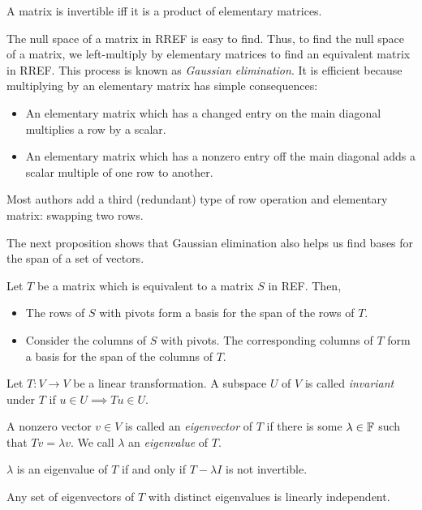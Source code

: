 \begin{prop}
  A matrix is invertible iff it is a product of elementary matrices.
\end{prop}
\begin{rem}
  The null space of a matrix in RREF is easy to find.
  Thus, to find the null space of a matrix, we left-multiply by elementary
  matrices to find an equivalent matrix in RREF\@. This process is known as
  \emph{Gaussian elimination}. It is efficient because
  multiplying by an elementary matrix has simple consequences:
  \begin{itemize}
    \item An elementary matrix which has a changed entry on the main diagonal
      multiplies a row by a scalar.
    \item An elementary matrix which has a nonzero entry off the main diagonal
      adds a scalar multiple of one row to another. 
  \end{itemize}
  Most authors add a third (redundant) type of row operation and elementary
  matrix: swapping two rows.

  The next proposition shows that Gaussian elimination also helps us find bases
  for the span of a set of vectors.
\end{rem}
\begin{prop}
  Let $T$ be a matrix which is equivalent to a matrix $S$ in REF\@. Then,
  \begin{itemize}
    \item The rows of $S$ with pivots form a basis for the span of the rows of $T$.
    \item Consider the columns of $S$ with pivots. The corresponding columns of
      $T$ form a basis for the span of the columns of $T$.
  \end{itemize}
\end{prop}
\begin{defn}
  Let $T:V\to V$ be a linear transformation. A subspace $U$ of $V$ is called
  \emph{invariant} under $T$ if $u\in U\implies Tu\in U$.

  A nonzero vector $v\in V$ is called an \emph{eigenvector} of $T$ if there is
  some $\lambda\in\mathbb{F}$ such that $Tv=\lambda v$. We call $\lambda$ an
  \emph{eigenvalue} of $T$.
\end{defn}
\begin{prop}
  $\lambda$ is an eigenvalue of $T$ if and only if $T-\lambda I$ is not
  invertible.
\end{prop}
\begin{prop}
  Any set of eigenvectors of $T$ with distinct eigenvalues is linearly
  independent.
\end{prop}
